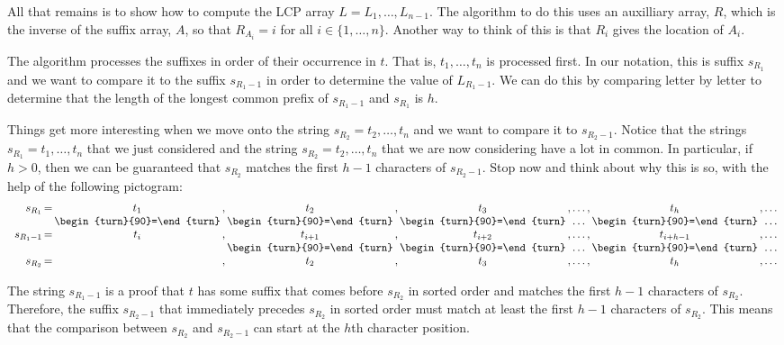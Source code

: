 All that remains is to show how to compute the LCP array $L=L_1,\ldots,L_{n-1}$.  The algorithm to do this uses an auxilliary array, $R$, which is the inverse of the suffix array, $A$, so that $R_{A_i} = i$ for all $i\in\{1,\ldots,n\}$.  Another way to think of this is that $R_i$ gives the location of $A_i$.

The algorithm processes the suffixes in order of their occurrence in $t$.
That is, $t_1,\ldots,t_n$ is processed first.  In our notation, this is suffix $s_{R_1}$ and we want to compare it to the suffix $s_{R_1-1}$ in order to determine the value of $L_{R_1-1}$.  We can do this by comparing letter by letter to determine that the length of the longest common prefix of $s_{R_1-1}$ and $s_{R_1}$ is $h$.

Things get more interesting when we move onto the string $s_{R_2}=t_2,\ldots,t_n$ and we want to compare it to $s_{R_2-1}$. Notice that the strings $s_{R_1}=t_1,\ldots,t_n$ that we just considered and the string $s_{R_2}=t_2,\ldots,t_n$ that we are now considering have a lot in common.  In particular, if $h>0$, then we can be guaranteed that $s_{R_2}$ matches the first $h-1$ characters of $s_{R_2-1}$.  Stop now and think about why this is so, with the help of the following pictogram:\\[\parskip]
\newcommand{\veq}{\begin{turn}{90}=\end{turn}}
\[
\begin{array}{r@{\,}c@{\,}c@{\,}c@{\,}c@{\,}c@{\,}c@{\,}c@{\,}c@{\,}c@{\,}c@{\,}c@{\,}c@{\,}c@{\,}c@{\,}}
s_{R_1}&=&t_1&,&t_2&,&t_3&,&\ldots&,&t_h&,&\ldots \\
       & &\veq&&\veq&&\veq&&\ldots&&\veq&&\ldots \\
s_{R_1-1}&=&t_i&,&t_{i+1}&,&t_{i+2}&,&\ldots&,&t_{i+h-1}&,&\ldots \\
       & & &&\veq&&\veq&&\ldots&&\veq&&\ldots \\
s_{R_2}&=& &,&t_2&,&t_{3}&,&\ldots&,&t_{h}&,&\ldots \\
\end{array}
\]

The string $s_{R_1-1}$ is a proof that $t$ has some suffix that comes
before $s_{R_2}$ in sorted order and matches the first $h-1$ characters of
$s_{R_2}$.  Therefore, the suffix $s_{R_2-1}$ that immediately precedes $s_{R_2}$ in sorted order must match at least the first $h-1$ characters of $s_{R_2}$.  This means that the comparison between $s_{R_2}$ and $s_{R_2-1}$ can start at the $h$th character position.

